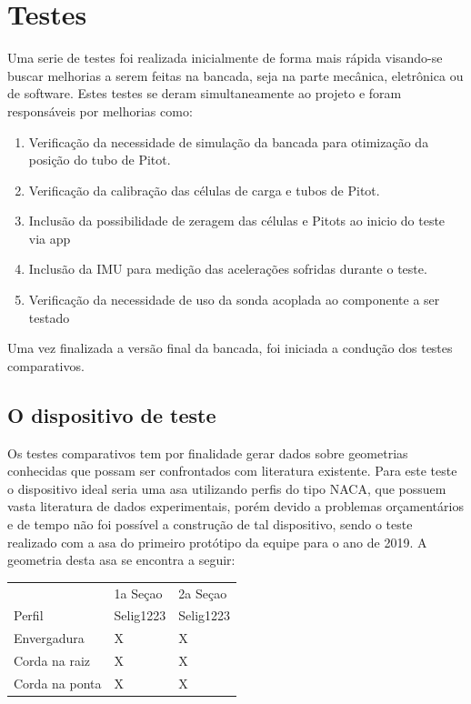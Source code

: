 \section{Testes}

Uma serie de testes foi realizada inicialmente de forma mais rápida visando-se buscar melhorias a serem feitas na bancada, seja na parte mecânica, eletrônica ou de software. Estes testes se deram simultaneamente ao projeto e foram responsáveis por melhorias como:

\begin{enumerate}
    \item Verificação da necessidade de simulação da bancada para otimização da posição do tubo de Pitot.
    \item Verificação da calibração das células de carga e tubos de Pitot.
    \item Inclusão da possibilidade de zeragem das células e Pitots ao inicio do teste via app
    \item Inclusão da IMU para medição das acelerações sofridas durante o teste.
    \item Verificação da necessidade de uso da sonda acoplada ao componente a ser testado
\end{enumerate}

Uma vez finalizada a versão final da bancada, foi iniciada a condução dos testes comparativos.

\subsection{O dispositivo de teste}

Os testes comparativos tem por finalidade gerar dados sobre geometrias conhecidas que possam ser confrontados com literatura existente. Para este teste o dispositivo ideal seria uma asa utilizando perfis do tipo NACA, que possuem vasta literatura de dados experimentais, porém devido a problemas orçamentários e de tempo não foi possível a construção de tal dispositivo, sendo o teste realizado com a asa do primeiro protótipo da equipe para o ano de 2019. A geometria desta asa se encontra a seguir:

\begin{table}[]
\centering
\begin{tabular}{lll}
 & 1a Seçao & 2a Seçao \\
Perfil & Selig1223 & Selig1223 \\
Envergadura & X & X \\
Corda na raiz & X & X \\
Corda na ponta & X & X
\end{tabular}
\end{table}


